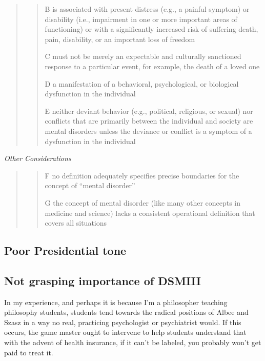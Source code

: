 \begin{refsection}
\begin{quote}
\begin{quote}
B is associated with present distress (e.g., a painful symptom) or disability (i.e., impairment in one or more important areas of functioning) or with a significantly increased risk of suffering death, pain, disability, or an important loss of freedom

C must not be merely an expectable and culturally sanctioned response to a particular event, for example, the death of a loved one

D a manifestation of a behavioral, psychological, or biological dysfunction in the individual

E neither deviant behavior (e.g., political, religious, or sexual) nor conflicts that are primarily between the individual and society are mental disorders unless the deviance or conflict is a symptom of a dysfunction in the individual
\end{quote}
\end{quote}

\emph{Other Considerations}

\begin{quote}

\begin{quote}

F no definition adequately specifies precise boundaries for the concept of “mental disorder”

G the concept of mental disorder (like many other concepts in medicine and science) lacks a consistent operational definition that covers all situations
\end{quote}
\end{quote}

\subsection{Poor Presidential tone}
\label{poorpresidentialtone}

\subsection{Not grasping importance of DSMIII}
\label{notgraspingimportanceofdsmiii}

In my experience, and perhaps it is because I'm a philosopher teaching philosophy students, students tend towards the radical positions of Albee and Szasz in a way no real, practicing psychologist or psychiatrist would. If this occurs, the game master ought to intervene to help students understand that with the advent of health insurance, if it can't be labeled, you probably won't get paid to treat it.


\end{refsection}
